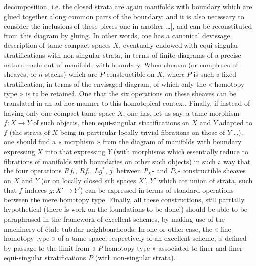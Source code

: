 \documentclass[11pt,a4paper]{article}
\begin{document}
decomposition, i.e. the closed strata are again manifolds with boundary which are glued together along common parts of the boundary; and it is also necessary to consider the inclusions of these pieces one in another …], and can be reconstituted from this diagram by gluing. In other words, one has a canonical devissage description of tame compact spaces $X$, eventually endowed with equi-singular stratifications with non-singular strata, in terms of finite diagrams of a precise nature made out of manifolds with boundary. When   sheaves (or complexes of sheaves, or $n$-stacks) which are $P$-constructible on $X$, where $P$ is such a fixed stratification,   in terms of the envisaged diagram, of which only the « homotopy type » is to be retained. One   that the six operations on these sheaves can be translated in an ad hoc manner to this homotopical context. Finally, if instead of having only one compact tame space $X$, one has, let us say, a tame morphism $f : X \to Y$ of such objects, then   equi-singular stratifications on $X$ and $Y$ adapted to $f$ (the strata of $X$ being in particular locally trivial fibrations on those of $Y$ …), one should find a « morphism » from the diagram of manifolds with boundary expressing $X$ into that expressing $Y$ (with   morphisms which essentially reduce to fibrations of  manifolds with boundaries on other such objects) in such a way that the four operations $Rf_*$, $Rf_!$, $Lg^*$, $g^!$ between $P_X$- and $P_Y$- constructible sheaves on $X$ and $Y$ (or on locally closed sub spaces $X'$, $Y'$ which are union of strata, such that $f$ induces $g : X' \to Y'$) can be expressed in terms of standard operations between the mere homotopy type. Finally, all these constructions, still partially hypothetical (there is work on the foundations to be done!) should be able to be paraphrased in the framework of excellent schemes, by making use of the machinery of étale tubular neighbourhoods. In one or other case, the « fine homotopy type » of a tame space, respectively of an excellent scheme, is defined by passage to the limit from « $P$-homotopy type » associated to finer and finer equi-singular stratifications $P$ (with non-singular strata).
\end{document}
